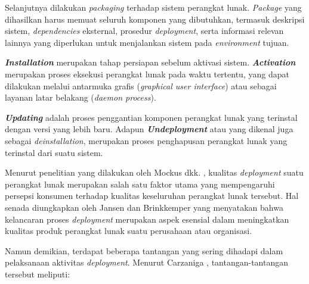 Selanjutnya dilakukan \textit{packaging} terhadap sistem perangkat lunak. \textit{Package} yang dihasilkan harus memuat seluruh komponen yang dibutuhkan, termasuk deskripsi sistem, \textit{dependencies} eksternal, prosedur \textit{deployment}, serta informasi relevan lainnya yang diperlukan untuk menjalankan sistem pada \textit{environment} tujuan.

\textbf{\textit{Installation}} merupakan tahap persiapan sebelum aktivasi sistem. \textbf{\textit{Activation}} merupakan proses eksekusi perangkat lunak pada waktu tertentu, yang dapat dilakukan melalui antarmuka grafis (\textit{graphical user interface}) atau sebagai layanan latar belakang (\textit{daemon process}).

\textbf{\textit{Updating}} adalah proses penggantian komponen perangkat lunak yang terinstal dengan versi yang lebih baru. Adapun \textbf{\textit{Undeployment}} atau yang dikenal juga sebagai \textit{deinstallation}, merupakan proses penghapusan perangkat lunak yang terinstal dari suatu sistem.
\par
Menurut penelitian yang dilakukan oleh Mockus dkk. \cite{Mockus2005}, kualitas \textit{deployment} suatu perangkat lunak merupakan salah satu faktor utama yang mempengaruhi persepsi konsumen terhadap kualitas keseluruhan perangkat lunak tersebut. Hal senada diungkapkan oleh Jansen dan Brinkkemper \cite{Jansen2006} yang menyatakan bahwa kelancaran proses \textit{deployment} merupakan aspek esensial dalam meningkatkan kualitas produk perangkat lunak suatu perusahaan atau organisasi.

Namun demikian, terdapat beberapa tantangan yang sering dihadapi dalam pelaksanaan aktivitas \textit{deployment}. Menurut Carzaniga \cite{Carzaniga1998}, tantangan-tantangan tersebut meliputi:

